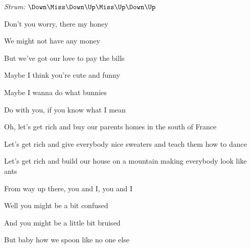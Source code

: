 \begin{song}


\begin{headerbox}
\textit{Strum:} $\Down\Miss\Down\Up\Miss\Up\Down\Up$
\end{headerbox}

\begin{hchordbox}
\end{hchordbox}

\large

\bigskip

\Intro {}

\bigskip

Don't you worry, there my honey \par
{}We might not have any money \par
{}But we've got our love to pay the bills \par

\bigskip

Maybe I think you're cute and funny \par
{}Maybe I wanna do what bunnies \par
{}Do with you, if you know what I mean \par

\bigskip

\begin{chorusboxwide}{\Chorus}
Oh, let's get rich and buy our parents homes in the south of France \par
Let's get rich and give everybody nice sweaters and teach them how to dance \par
Let's get rich and build our house on a mountain making everybody look like ants \par
From way up there, you and I, you and I \par
\end{chorusboxwide}

\bigskip

Well you might be a bit confused \par
And you might be a little bit bruised \par
But baby how we spoon like no one else \par


\end{song}
